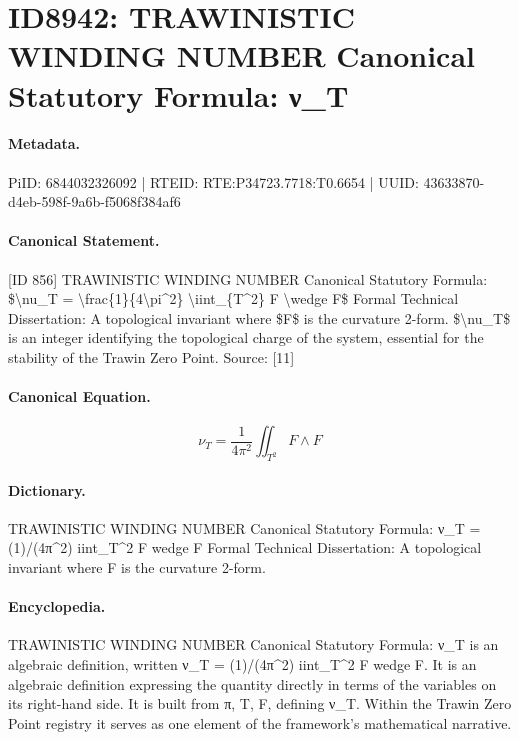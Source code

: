\section*{ID8942: TRAWINISTIC WINDING NUMBER Canonical Statutory Formula: ν\_T}
\paragraph{Metadata.}
PiID: 6844032326092 | RTEID: RTE:P34723.7718:T0.6654 | UUID: 43633870-d4eb-598f-9a6b-f5068f384af6

\paragraph{Canonical Statement.}
[ID 856] TRAWINISTIC WINDING NUMBER Canonical Statutory Formula: \$\textbackslash{}nu\_T = \textbackslash{}frac\{1\}\{4\textbackslash{}pi\textasciicircum{}2\} \textbackslash{}iint\_\{T\textasciicircum{}2\} F \textbackslash{}wedge F\$ Formal Technical Dissertation: A topological invariant where \$F\$ is the curvature 2-form. \$\textbackslash{}nu\_T\$ is an integer identifying the topological charge of the system, essential for the stability of the Trawin Zero Point. Source: [11]

\paragraph{Canonical Equation.}
\[
\nu_T = \frac{1}{4\pi^2} \iint_{T^2} F \wedge F
\]

\paragraph{Dictionary.}
TRAWINISTIC WINDING NUMBER Canonical Statutory Formula: ν\_T = (1)/(4π\textasciicircum{}2) iint\_T\textasciicircum{}2 F wedge F Formal Technical Dissertation: A topological invariant where F is the curvature 2-form.

\paragraph{Encyclopedia.}
TRAWINISTIC WINDING NUMBER Canonical Statutory Formula: ν\_T is an algebraic definition, written ν\_T = (1)/(4π\textasciicircum{}2) iint\_T\textasciicircum{}2 F wedge F. It is an algebraic definition expressing the quantity directly in terms of the variables on its right-hand side. It is built from π, T, F, defining ν\_T. Within the Trawin Zero Point registry it serves as one element of the framework's mathematical narrative.
